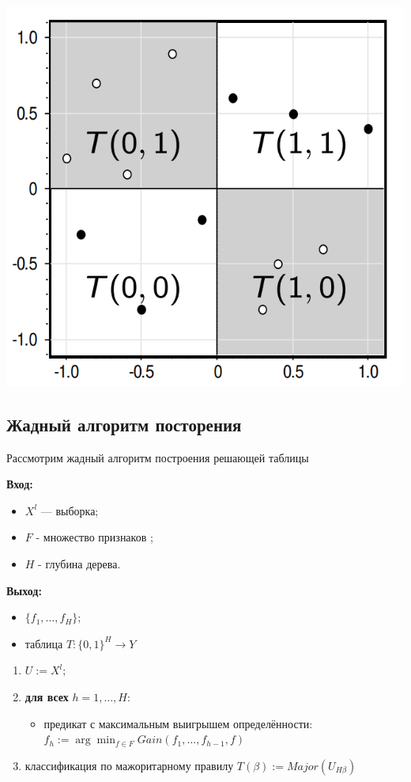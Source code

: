 \includegraphics[scale = 0.5]{chapters/logical/images/decide_table_example.png}

\subsection{Жадный алгоритм посторения}
Рассмотрим жадный алгоритм построения решающей таблицы

\textbf{Вход:}
\begin{itemize}
    \item $X^l$ — выборка;
    \item $F$ - множество признаков ;
    \item $H$ - глубина дерева.
\end{itemize}

\textbf{Выход:}
\begin{itemize}
    \item $\{f_1, \dots, f_H\};$
    \item таблица $T: \{0, 1\}^H \xrightarrow{} Y$
\end{itemize}


\begin{enumerate}
    \item $U := X^l;$
    \item \textbf{для всех} $h = 1, \dots, H$:
          \begin{itemize}
              \item предикат с максимальным выигрышем определённости:
                    $f_h := \arg\min_{f \in F} Gain(f_1, \dots, f_{h-1}, f)$
          \end{itemize}
    \item классификация по мажоритарному правилу
          $ T(\beta) := Major(U_{H\beta}) $
\end{enumerate}

